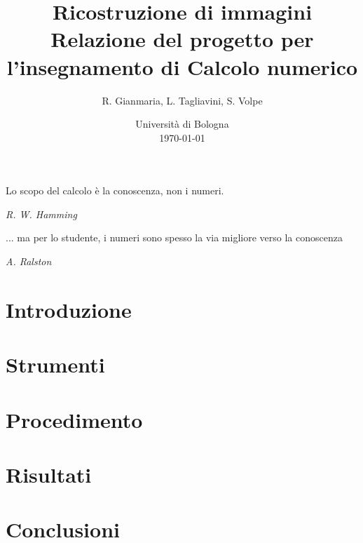 \documentclass[a4paper]{article}
\title{Ricostruzione di immagini \\
\large Relazione del progetto per l'insegnamento di Calcolo numerico}
\author{
  R. Gianmaria,
  L. Tagliavini,
  S. Volpe
}
\date{
	Universit\`a di Bologna \\
  \today
}
\begin{document}
\maketitle
\thispagestyle{empty}

\epigraph{Lo scopo del calcolo è la conoscenza, non i numeri.}
{\textit{R. W. Hamming}}
\epigraph{... ma per lo studente, i numeri sono spesso la via migliore verso la
conoscenza}
{\textit{A. Ralston}}

\section{Introduzione}

\section{Strumenti}

\section{Procedimento}

\section{Risultati}

\section{Conclusioni}
\end{document}
